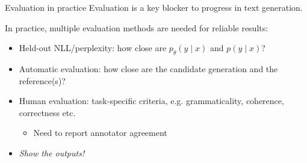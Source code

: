 \documentclass[usenames,dvipsnames,notes]{beamer}
\begin{document}
\begin{frame}
    {Evaluation in practice}
    Evaluation is a key blocker to progress in text generation.

    In practice, multiple evaluation methods are needed for reliable results:\\
    \begin{itemize}
        \item Held-out NLL/perplexity: how close are $p_\theta(y\mid x)$ and $p(y\mid x)$?
        \item Automatic evaluation: how close are the candidate generation and the reference(s)?
        \item Human evaluation: task-specific criteria, e.g. grammaticality, coherence, correctness etc.
            \begin{itemize}
                \item Need to report annotator agreement
            \end{itemize}
        \item \emph{Show the outputs!}
    \end{itemize}
\end{frame}

\end{document}
